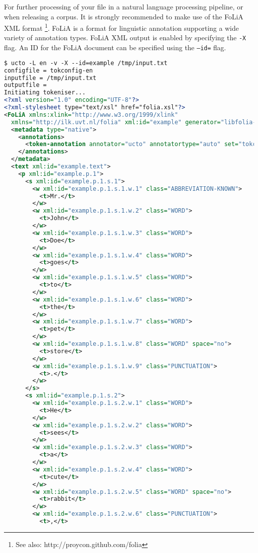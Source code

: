 \documentclass[a4paper,12pt]{report}
\begin{document}
For further processing of your file in a natural language processing pipeline, or when releasing a corpus. It is strongly recommended to make use of the FoLiA XML format \cite{FOLIA} \footnote{See also:  http://proycon.github.com/folia}. FoLiA is a format for linguistic annotation supporting a wide variety of annotation types. FoLiA XML output is enabled by specifying the \texttt{-X} flag. An ID for the FoLiA document can be specified using the \texttt{--id=} flag.

\begin{lstlisting}[language=xml]
$ ucto -L en -v -X --id=example /tmp/input.txt
configfile = tokconfig-en
inputfile = /tmp/input.txt
outputfile = 
Initiating tokeniser...
<?xml version="1.0" encoding="UTF-8"?>
<?xml-stylesheet type="text/xsl" href="folia.xsl"?>
<FoLiA xmlns:xlink="http://www.w3.org/1999/xlink" 
  xmlns="http://ilk.uvt.nl/folia" xml:id="example" generator="libfolia-v0.10">
  <metadata type="native">
    <annotations>
      <token-annotation annotator="ucto" annotatortype="auto" set="tokconfig-en"/>
    </annotations>
  </metadata>
  <text xml:id="example.text">
    <p xml:id="example.p.1">
      <s xml:id="example.p.1.s.1">
        <w xml:id="example.p.1.s.1.w.1" class="ABBREVIATION-KNOWN">
          <t>Mr.</t>
        </w>
        <w xml:id="example.p.1.s.1.w.2" class="WORD">
          <t>John</t>
        </w>
        <w xml:id="example.p.1.s.1.w.3" class="WORD">
          <t>Doe</t>
        </w>
        <w xml:id="example.p.1.s.1.w.4" class="WORD">
          <t>goes</t>
        </w>
        <w xml:id="example.p.1.s.1.w.5" class="WORD">
          <t>to</t>
        </w>
        <w xml:id="example.p.1.s.1.w.6" class="WORD">
          <t>the</t>
        </w>
        <w xml:id="example.p.1.s.1.w.7" class="WORD">
          <t>pet</t>
        </w>
        <w xml:id="example.p.1.s.1.w.8" class="WORD" space="no">
          <t>store</t>
        </w>
        <w xml:id="example.p.1.s.1.w.9" class="PUNCTUATION">
          <t>.</t>
        </w>
      </s>
      <s xml:id="example.p.1.s.2">
        <w xml:id="example.p.1.s.2.w.1" class="WORD">
          <t>He</t>
        </w>
        <w xml:id="example.p.1.s.2.w.2" class="WORD">
          <t>sees</t>
        </w>
        <w xml:id="example.p.1.s.2.w.3" class="WORD">
          <t>a</t>
        </w>
        <w xml:id="example.p.1.s.2.w.4" class="WORD">
          <t>cute</t>
        </w>
        <w xml:id="example.p.1.s.2.w.5" class="WORD" space="no">
          <t>rabbit</t>
        </w>
        <w xml:id="example.p.1.s.2.w.6" class="PUNCTUATION">
          <t>,</t>

\end{lstlisting}
\end{document}

